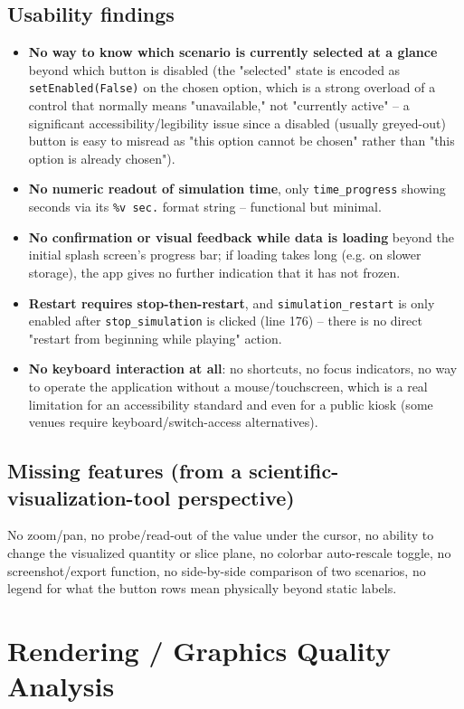 \documentclass[11pt,a4paper]{report}
\begin{document}
\section{Usability findings}
\begin{itemize}[nosep]
\item \textbf{No way to know which scenario is currently selected at a glance} beyond which button is
disabled (the "selected" state is encoded as \texttt{setEnabled(False)} on the chosen option, which is
a strong overload of a control that normally means "unavailable," not "currently active" -- a
significant accessibility/legibility issue since a disabled (usually greyed-out) button is easy to
misread as "this option cannot be chosen" rather than "this option is already chosen").
\item \textbf{No numeric readout of simulation time}, only \texttt{time\_progress} showing seconds via
its \texttt{\%v sec.} format string -- functional but minimal.
\item \textbf{No confirmation or visual feedback while data is loading} beyond the initial splash
screen's progress bar; if loading takes long (e.g. on slower storage), the app gives no further
indication that it has not frozen.
\item \textbf{Restart requires stop-then-restart}, and \texttt{simulation\_restart} is only enabled
after \texttt{stop\_simulation} is clicked (line 176) -- there is no direct "restart from beginning
while playing" action.
\item \textbf{No keyboard interaction at all}: no shortcuts, no focus indicators, no way to operate the
application without a mouse/touchscreen, which is a real limitation for an accessibility standard and
even for a public kiosk (some venues require keyboard/switch-access alternatives).
\end{itemize}

\section{Missing features (from a scientific-visualization-tool perspective)}
No zoom/pan, no probe/read-out of the value under the cursor, no ability to change the visualized
quantity or slice plane, no colorbar auto-rescale toggle, no screenshot/export function, no side-by-side
comparison of two scenarios, no legend for what the button rows mean physically beyond static labels.

\chapter{Rendering / Graphics Quality Analysis}
\end{document}
